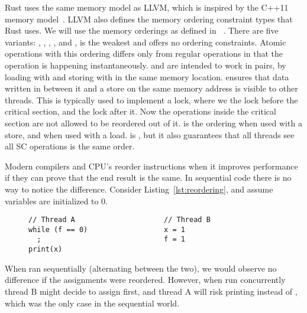 \documentclass[a4paper,twoside]{report}
\begin{document}
Rust uses the same memory model as LLVM, which is inspired by the C++11 memory
model~\cite{llvmmm}. LLVM also defines the memory ordering constraint types that
Rust uses. We will use the memory orderings as defined in
~\cite{rust-ordering}. There are five variants:
, , , , and
,  is the weakest and offers no ordering
constraints.  Atomic operations with this ordering differs only from regular
operations in that the operation is happening instantaneously.
 and  are intended to work in pairs, by loading with
 and storing with  in the same memory location.
 ensures that data written in between it and a 
store on the same memory address is visible to other threads. This is typically
used to implement a lock, where we  the lock before the critical
section, and  the lock after it. Now the operations inside the
critical section are not allowed to be reordered out of it.
 is the  ordering when used with a store, and
 when used with a load.  is , but it
also guarantees that all threads see all SC operations is the same order.


Modern compilers and CPU's reorder instructions when it improves
performance if they can prove that the end result is the same.  In sequential
code there is no way to notice the difference.  Consider
Listing~\ref{lst:reordering}, and assume variables are initialized to 0.
\begin{figure}[ht]
\begin{lstlisting}[caption=Instruction reordering,label=lst:reordering]
// Thread A                     // Thread B
while (f == 0)                  x = 1
  ;                             f = 1
print(x)
\end{lstlisting}
\end{figure}
When ran sequentially (alternating between the two), we would observe no
difference if the assignments were reordered. However, when run concurrently
thread B might decide to assign  first, and thread A will risk
printing  instead of , which was the only case in the
sequential world.
\end{document}
